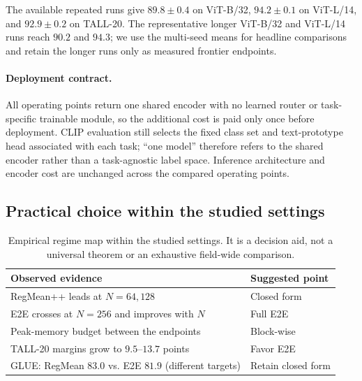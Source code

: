 \documentclass[letterpaper]{article} %
\theoremstyle{plain}
\theoremstyle{definition}
\begin{document}
The available repeated runs give $89.8\pm0.4$ on ViT-B/32, $94.2\pm0.1$ on ViT-L/14, and $92.9\pm0.2$ on TALL-20.
The representative longer ViT-B/32 and ViT-L/14 runs reach $90.2$ and $94.3$; we use the multi-seed means for headline comparisons and retain the longer runs only as measured frontier endpoints.

\paragraph{Deployment contract.}
All operating points return one shared encoder with no learned router or task-specific trainable module, so the additional cost is paid only once before deployment.
CLIP evaluation still selects the fixed class set and text-prototype head associated with each task; ``one model'' therefore refers to the shared encoder rather than a task-agnostic label space.
Inference architecture and encoder cost are unchanged across the compared operating points.

\subsection{Practical choice within the studied settings}

\begin{table}[tb]
\centering
\small
\setlength{\tabcolsep}{4pt}
\begin{tabular}{p{}p{}}
\toprule
Observed evidence & Suggested point \\
\midrule
RegMean++ leads at $N=64,128$ & Closed form \\
E2E crosses at $N=256$ and improves with $N$ & Full E2E \\
Peak-memory budget between the endpoints & Block-wise \\
TALL-20 margins grow to $9.5$--$13.7$ points & Favor E2E \\
GLUE: RegMean $83.0$ vs. E2E $81.9$ (different targets) & Retain closed form \\
\bottomrule
\end{tabular}
\caption{Empirical regime map within the studied settings. It is a decision aid, not a
universal theorem or an exhaustive field-wide comparison.}
\label{tab:regime-map}
\end{table}
\end{document}
